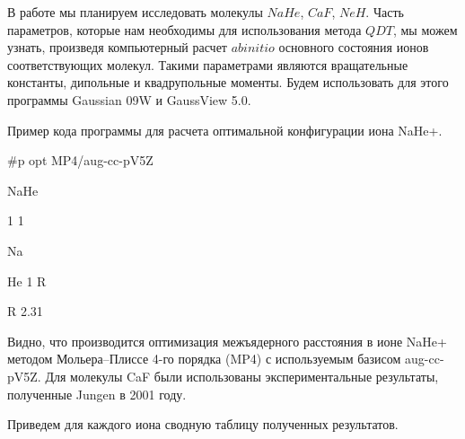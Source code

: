 В работе мы планируем исследовать молекулы $NaHe$, $CaF$, $NeH$. 
Часть параметров, которые нам необходимы для использования метода $QDT$, мы можем узнать, произведя компьютерный расчет $ab initio$ основного состояния ионов соответствующих молекул.
Такими параметрами являются вращательные константы, дипольные и квадрупольные моменты. 
Будем использовать для этого программы \foreignlanguage{english}{Gaussian 09W} и \foreignlanguage{english}{GaussView} 5.0.

Пример кода программы для расчета оптимальной конфигурации иона
\foreignlanguage{english}{NaHe}+.

\foreignlanguage{english}{\#p opt MP4/aug-cc-pV5Z}

\foreignlanguage{english}{NaHe}

\foreignlanguage{english}{1 1}

\foreignlanguage{english}{Na \ \ \ \ \ \ \ \ \ \ \ \ }

\foreignlanguage{english}{He 1 R}

\foreignlanguage{english}{R 2.31}

Видно, что производится оптимизация межъядерного расстояния в ионе \foreignlanguage{english}{NaHe}+ методом Мольера--Плиссе 4-го порядка (\foreignlanguage{english}{MP}4) с используемым базисом aug-cc-pV5Z. 
Для молекулы \foreignlanguage{english}{CaF} были использованы экспериментальные результаты,
полученные \foreignlanguage{english}{Jungen} в 2001 году.

Приведем для каждого иона сводную таблицу полученных результатов.


